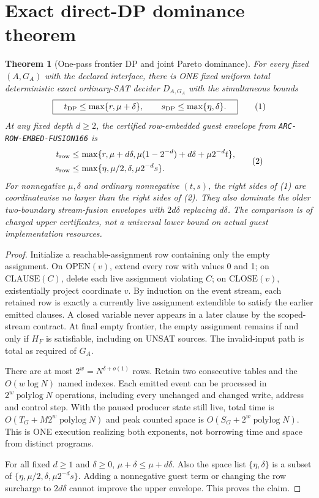 \documentclass[11pt]{article}
\newtheorem{theorem}{Theorem}
\begin{document}
\section{Exact direct-DP dominance theorem}
\begin{theorem}[One-pass frontier DP and joint Pareto dominance]
For every fixed $(A,G_A)$ with the declared interface, there is ONE
fixed uniform total deterministic exact ordinary-SAT decider $D_{A,G_A}$
with the simultaneous bounds
\[
\boxed{\quad t_{\rm DP}\le\max\{r,\mu+\delta\},\qquad
s_{\rm DP}\le\max\{\eta,\delta\}.\quad}\tag{1}
\]
At any fixed depth $d\ge2$, the certified row-embedded guest envelope
from \texttt{ARC-ROW-EMBED-FUSION166} is
\[
\begin{split}
t_{\rm row}&\le
 \max\{r,\mu+d\delta,
       \mu(1-2^{-d})+d\delta+\mu2^{-d}t\},\\
s_{\rm row}&\le
 \max\{\eta,\mu/2,\delta,\mu2^{-d}s\}.
\end{split}\tag{2}
\]
For nonnegative $\mu,\delta$ and ordinary nonnegative $(t,s)$, the
right sides of (1) are coordinatewise no larger than the right sides
of (2). They also dominate the older two-boundary stream-fusion
envelopes with $2d\delta$ replacing $d\delta$. The comparison is
of \emph{charged upper certificates}, not a universal lower bound
on actual guest implementation resources.
\end{theorem}
\begin{proof}
Initialize a reachable-assignment row containing only the empty
assignment. On $\mathrm{OPEN}(v)$, extend every row with values 0 and 1;
on $\mathrm{CLAUSE}(C)$, delete each live assignment violating $C$;
on $\mathrm{CLOSE}(v)$, existentially project coordinate $v$.
By induction on the event stream, each retained row is exactly a
currently live assignment extendible to satisfy the earlier emitted
clauses. A closed variable never appears in a later clause by the
scoped-stream contract. At final empty frontier, the empty assignment
remains if and only if $H_F$ is satisfiable, including on UNSAT
sources. The invalid-input path is total as required of $G_A$.

There are at most $2^w=N^{\delta+o(1)}$ rows. Retain two consecutive
tables and the $O(w\log N)$ named indexes. Each emitted event can be
processed in $2^w\operatorname{polylog}N$ operations, including every
unchanged and changed write, address and control step. With the paused
producer state still live, total time is
$O(T_G+M2^w\operatorname{polylog}N)$ and peak counted space is
$O(S_G+2^w\operatorname{polylog}N)$. This is ONE execution realizing
both exponents, not borrowing time and space from distinct programs.

For all fixed $d\ge1$ and $\delta\ge0$,
$\mu+\delta\le\mu+d\delta$. Also the space list
$\{\eta,\delta\}$ is a subset of
$\{\eta,\mu/2,\delta,\mu2^{-d}s\}$.
Adding a nonnegative guest term or changing the row surcharge to
$2d\delta$ cannot improve the upper envelope. This proves the claim.
\end{proof}
\end{document}
